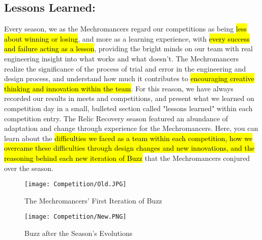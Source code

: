\subsection*{\textbf{\Huge Lessons Learned:}}
\vspace{.2cm}
\setlength{\parindent}{.25in} 
Every season, we as the Mechromancers regard our competitions as being \hl{less about winning or losing}, and more as a learning experience, with \hl{every success and failure acting as a lesson}, providing the bright minds on our team with real engineering insight into what works and what doesn't. The Mechromancers realize the significance of the process of trial and error in the engineering and design process, and understand how much it contributes to \hl{encouraging creative thinking and innovation within the team}. For this reason, we have always recorded our results in meets and competitions, and present what we learned on competition day in a small, bulleted section called "lessons learned" within each competition entry. The Relic Recovery season featured an abundance of adaptation and change through experience for the Mechromancers. Here, you can learn about the \hl{difficulties we faced as a team within each competition, how we overcame these difficulties through design changes and new innovations, and the reasoning behind each new iteration of Buzz} that the Mechromancers conjured over the season. 
\begin{figure}
 \centering
 \begin{minipage}{.48\textwidth}
   \centering
   \texttt{[image: Competition/Old.JPG]}
   \caption{The Mechromancers' First Iteration of Buzz}
   \label{fig:FirstIt}
 \end{minipage}%
\hfill
 \begin{minipage}{.48\textwidth}
   \centering
   \texttt{[image: Competition/New.PNG]}
   \caption{Buzz after the Season's Evolutions}
   \label{fig:Evolved}
 \end{minipage}
 \end{figure}

